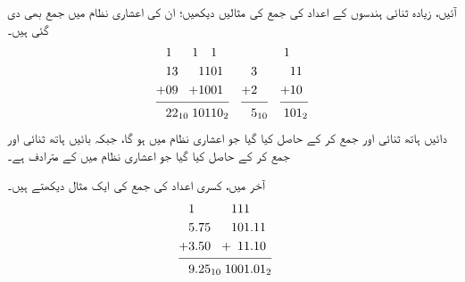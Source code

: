 آئیں، زیادہ ثنائی ہندسوں کے اعداد کی جمع کی مثالیں دیکھیں؛ ان کی اعشاری نظام میں جمع بھی دی گئی ہیں۔
\begin{align*}
\begin{split}
&1\\
&13\\
+&09\\
\noalign{\smallskip}\hline\noalign{\smallskip}
&22_{10}
\end{split}&
\begin{split}
1&\phantom{11}1\\
&1101\\
+&1001\\
\noalign{\smallskip}\hline\noalign{\smallskip}
1&0110_2
\end{split}&&
\begin{split}
&\\
&3\\
+&2\\
\noalign{\smallskip}\hline\noalign{\smallskip}
&5_{10}
\end{split}&
\begin{split}
1&\\
&11\\
+&10\\
\noalign{\smallskip}\hline\noalign{\smallskip}
1&01_2
\end{split}
\end{align*}
دائیں ہاتھ ثنائی  اور  جمع کر کے  حاصل کیا گیا جو اعشاری نظام میں ہو گا، جبکہ بائیں ہاتھ ثنائی  اور  جمع کر کے  حاصل کیا گیا جو اعشاری نظام میں  کے مترادف ہے۔

آخر میں، کسری اعداد کی جمع کی ایک مثال دیکھتے ہیں۔
\begin{align*}
\begin{split}
&1\\
&5.75\\
+&3.50\\
\noalign{\smallskip}\hline\noalign{\smallskip}
&9.25_{10}
\end{split}&
\begin{split}
&111\\
&101.11\\
+&\phantom{1}11.10\\
\noalign{\smallskip}\hline\noalign{\smallskip}
1&001.01_2
\end{split}
\end{align*}


